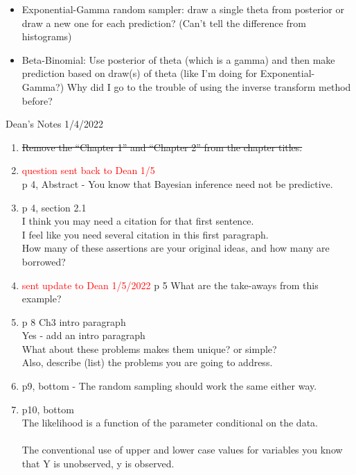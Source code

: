 \documentclass[12pt, a4paper]{article}
\begin{document}
\begin{itemize}
  \item Exponential-Gamma random sampler:  draw a single theta from posterior or draw a new one for each prediction?  (Can't tell the difference from histograms)
  \item Beta-Binomial:  Use posterior of theta (which is a gamma) and then make prediction based on draw(s) of theta (like I'm doing for Exponential-Gamma?)  Why did I go to the trouble of using the inverse transform method before?
\end{itemize}


{\huge Dean's Notes 1/4/2022}
\begin{enumerate}
  \item \sout{Remove the ``Chapter 1” and “Chapter 2” from the chapter titles.}
  \item \textcolor{red}{question sent back to Dean 1/5}\\
    p 4, Abstract - You know that Bayesian inference need not be predictive.
  \item p 4, section 2.1 \\
    I think you may need a citation for that first  sentence.\\
    I feel like you need several citation in this first paragraph.\\
    How many of these assertions are your original ideas, and how many are borrowed?\\

  \item \textcolor{red}{sent update to Dean 1/5/2022} p 5  What are the take-aways from this example?
  \item p 8 Ch3  intro paragraph\\
    Yes - add an intro paragraph\\
    What about these problems makes them unique? or simple?\\
    Also, describe (list) the problems you are going to address.\\
  \item p9, bottom - The random sampling should work the same either way.
  \item p10, bottom \\
    The likelihood is a function of the parameter conditional on the data.\\\\

    The conventional use of upper and lower case values for variables you know that Y is unobserved, y is observed.\\\\


\end{enumerate}
\end{document}
